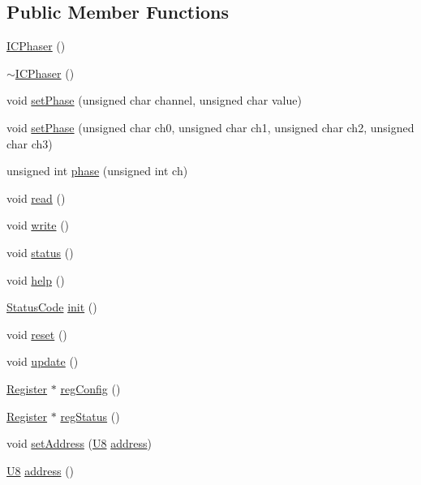 \subsection*{Public Member Functions}
\begin{DoxyCompactItemize}
\item 
\hyperlink{classICPhaser_adcbdbce69b6d9e97809f168e3ecbda30}{I\+C\+Phaser} ()
\item 
\hyperlink{classICPhaser_a70e439f0c27e1171fef80b774ca83ab6}{$\sim$\+I\+C\+Phaser} ()
\item 
void \hyperlink{classICPhaser_a93d99f9980c4a85d0d5570e56ae5d1bb}{set\+Phase} (unsigned char channel, unsigned char value)
\item 
void \hyperlink{classICPhaser_a7bb639e8a7bd98c20b29c9fc3b4ffcce}{set\+Phase} (unsigned char ch0, unsigned char ch1, unsigned char ch2, unsigned char ch3)
\item 
unsigned int \hyperlink{classICPhaser_a1aa92666783d3b77ef73f2c6ef41f419}{phase} (unsigned int ch)
\item 
void \hyperlink{classICPhaser_a79170c0639b8bcedd267a99a1857c9a7}{read} ()
\item 
void \hyperlink{classICPhaser_a160d0f9b959c865fc3458857bb303dd0}{write} ()
\item 
void \hyperlink{classICPhaser_a8169d433a2789fdb1453d01f1c11517f}{status} ()
\item 
void \hyperlink{classICPhaser_a8650cfbe21e6dfa96f3a858507105f3b}{help} ()
\item 
\hyperlink{classStatusCode}{Status\+Code} \hyperlink{classICPhaser_a798ede3a88e57efd1545b6594d2d7be5}{init} ()
\item 
void \hyperlink{classICPhaser_aa20b5b71ef76a97b9ff9688cb360293c}{reset} ()
\item 
void \hyperlink{classICPhaser_a69e1f428f33dbdc5b6f00027c022a4e7}{update} ()
\item 
\hyperlink{classRegister}{Register} $\ast$ \hyperlink{classICPhaser_ae22a3e794e85fbcafa154b4ba2d2e8d1}{reg\+Config} ()
\item 
\hyperlink{classRegister}{Register} $\ast$ \hyperlink{classICPhaser_a075f0f88445142d07a02c21401a0e342}{reg\+Status} ()
\item 
void \hyperlink{classICPhaser_aacedf2a891a7946818a38afdbb29b52a}{set\+Address} (\hyperlink{classICPhaser_a4f9b2302efbd7bdd70d7d80b415f1a9d}{U8} \hyperlink{classICPhaser_ac5cd0f3cb56324782ae8d360944a94fd}{address})
\item 
\hyperlink{classICPhaser_a4f9b2302efbd7bdd70d7d80b415f1a9d}{U8} \hyperlink{classICPhaser_ac5cd0f3cb56324782ae8d360944a94fd}{address} ()
\end{DoxyCompactItemize}
